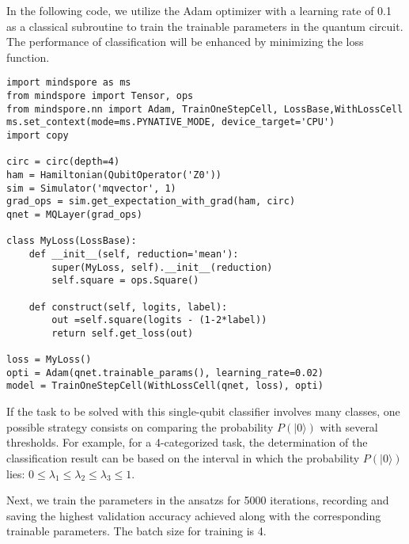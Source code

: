 In the following code, we utilize the Adam optimizer with a learning rate of 0.1 as a classical subroutine to train the trainable parameters in the quantum circuit. The performance of classification will be enhanced  by minimizing the loss function.


\begin{lstlisting}
import mindspore as ms
from mindspore import Tensor, ops
from mindspore.nn import Adam, TrainOneStepCell, LossBase,WithLossCell
ms.set_context(mode=ms.PYNATIVE_MODE, device_target='CPU')
import copy

circ = circ(depth=4)
ham = Hamiltonian(QubitOperator('Z0'))
sim = Simulator('mqvector', 1)
grad_ops = sim.get_expectation_with_grad(ham, circ)
qnet = MQLayer(grad_ops)

class MyLoss(LossBase):
    def __init__(self, reduction='mean'):
        super(MyLoss, self).__init__(reduction)
        self.square = ops.Square()

    def construct(self, logits, label):
        out =self.square(logits - (1-2*label))
        return self.get_loss(out)

loss = MyLoss()
opti = Adam(qnet.trainable_params(), learning_rate=0.02)
model = TrainOneStepCell(WithLossCell(qnet, loss), opti)

\end{lstlisting}
If the task to be solved  with this single-qubit classifier involves many classes, one possible strategy consists on comparing the probability $P(|0\rangle)$  with several thresholds. For example, for a 4-categorized task, the determination of the classification result can be based on the interval in which the probability $P(|0\rangle)$ lies: $0\leqslant\lambda_1\leqslant\lambda_2\leqslant\lambda_3\leqslant1$.

Next, we train the parameters in the ansatzs  for 5000 iterations, recording and saving the highest validation accuracy achieved along with the corresponding trainable parameters. The batch size for training is 4.

